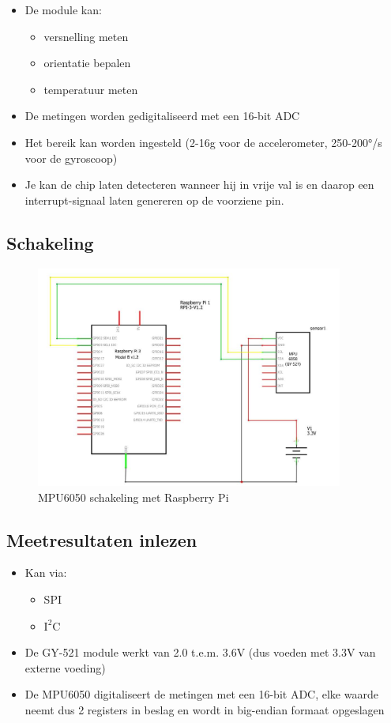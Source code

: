 \documentclass{article}
\begin{document}
\begin{itemize}
    \item De module kan:
    \begin{itemize}
        \item versnelling meten
        \item orientatie bepalen
        \item temperatuur meten
    \end{itemize}
    \item De metingen worden gedigitaliseerd met een 16-bit ADC 
    \item Het bereik kan worden ingesteld (2-16g voor de accelerometer, 250-200°/s voor de gyroscoop)
    \item Je kan de chip laten detecteren wanneer hij in vrije val is en daarop een interrupt-signaal laten genereren op de voorziene pin.
\end{itemize}

\subsection{Schakeling}
\begin{figure}[H]
    \centering
    \includegraphics[width=0.9\textwidth]{mpu6050.png}
    \caption{MPU6050 schakeling met Raspberry Pi}
\end{figure}




\subsection{Meetresultaten inlezen}

\begin{itemize}
    \item Kan via:
    \begin{itemize}
        \item SPI
        \item $\text{I}^2\text{C}$
    \end{itemize}
    \item De GY-521 module werkt van 2.0 t.e.m. 3.6V (dus voeden met 3.3V van externe voeding)
    \item De MPU6050 digitaliseert de metingen met een 16-bit ADC, elke waarde neemt dus 2 registers in beslag en wordt in big-endian formaat opgeslagen
\end{itemize}
\end{document}
